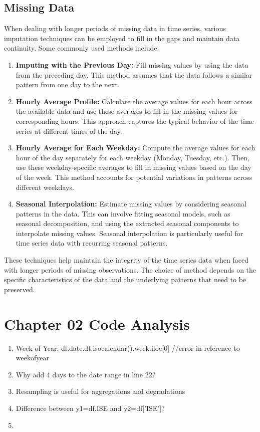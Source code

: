 \documentclass{article}
\begin{document}
\subsection{Missing Data}

When dealing with longer periods of missing data in time series, various imputation techniques can be employed to fill in the gaps and maintain data continuity. Some commonly used methods include:

\begin{enumerate}
    \item \textbf{Imputing with the Previous Day:} Fill missing values by using the data from the preceding day. This method assumes that the data follows a similar pattern from one day to the next.
    
    \item \textbf{Hourly Average Profile:} Calculate the average values for each hour across the available data and use these averages to fill in the missing values for corresponding hours. This approach captures the typical behavior of the time series at different times of the day.
    
    \item \textbf{Hourly Average for Each Weekday:} Compute the average values for each hour of the day separately for each weekday (Monday, Tuesday, etc.). Then, use these weekday-specific averages to fill in missing values based on the day of the week. This method accounts for potential variations in patterns across different weekdays.
    
    \item \textbf{Seasonal Interpolation:} Estimate missing values by considering seasonal patterns in the data. This can involve fitting seasonal models, such as seasonal decomposition, and using the extracted seasonal components to interpolate missing values. Seasonal interpolation is particularly useful for time series data with recurring seasonal patterns.
\end{enumerate}

These techniques help maintain the integrity of the time series data when faced with longer periods of missing observations. The choice of method depends on the specific characteristics of the data and the underlying patterns that need to be preserved.

\section{Chapter 02 Code Analysis}
\begin{enumerate}
    \item Week of Year: {df.date.dt.isocalendar().week.iloc[0]} //error in reference to weekofyear
    \item Why add 4 days to the date range in line 22?
    \item Resampling is useful for aggregations and degradations
    \item Difference between y1=df.ISE and y2=df['ISE']?
    \item 
\end{enumerate}
\end{document}

